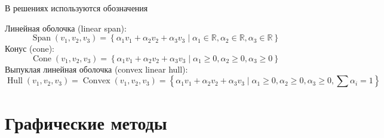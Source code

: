 \documentclass[12pt]{article}
\newcommand \RR{\mathbb{R}}
\DeclareMathOperator{\Convex}{Convex}
\DeclareMathOperator{\Hull}{Hull}
\DeclareMathOperator{\Span}{Span}
\DeclareMathOperator{\cone}{Cone}
\begin{document}
В решениях используются обозначения
\begin{leftbar}
  \noindent
  Линейная оболочка (linear span):
  \[
    \Span(v_1, v_2, v_3) = \left\{\alpha_1 v_1 + \alpha_2 v_2 + \alpha_3 v_3 \mid \alpha_1 \in \RR, \alpha_2 \in \RR, \alpha_3 \in \RR \right\}
  \]
  Конус (cone):
  \[
    \cone(v_1, v_2, v_3) = \left\{\alpha_1 v_1 + \alpha_2 v_2 + \alpha_3 v_3 \mid \alpha_1 \geq 0, \alpha_2 \geq 0, \alpha_3 \geq 0 \right\}
  \]
  Выпуклая линейная оболочка (convex linear hull):
  \[
    \Hull(v_1, v_2, v_3) = \Convex(v_1, v_2, v_3) = \left\{\alpha_1 v_1 + \alpha_2 v_2 + \alpha_3 v_3 \mid \alpha_1 \geq 0, \alpha_2 \geq 0, \alpha_3 \geq 0, \sum \alpha_i = 1 \right\}
  \]
\end{leftbar}
  

\section*{Графические методы}
\end{document}
